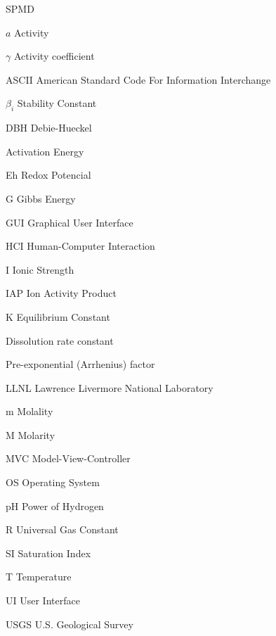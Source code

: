 \begin{listofabbrv}{SPMD}
\item[$a$] Activity
\item[$\gamma$] Activity coefficient
\item[ASCII] American Standard Code For Information Interchange
\item[$\beta_i$] Stability Constant         
\item[DBH] Debie-Hueckel 
\item[\ce{E_a}] Activation Energy
\item[Eh] Redox Potencial
\item[G] Gibbs Energy
\item[GUI] Graphical User Interface
\item[HCI] Human-Computer Interaction        
\item[I] Ionic Strength
\item[IAP] Ion Activity Product 
\item[K] Equilibrium Constant        
\item[\ce{k_{diss}}] Dissolution rate constant
\item[\ce{k_0}] Pre-exponential (Arrhenius) factor
\item[LLNL] Lawrence Livermore National Laboratory
\item[m] Molality
\item[M] Molarity
\item[MVC] Model-View-Controller
\item[OS] Operating System
\item[pH] Power of Hydrogen
\item[R] Universal Gas Constant
\item[SI] Saturation Index 
\item[T] Temperature
\item[UI] User Interface
\item[USGS] U.S. Geological Survey
\end{listofabbrv}